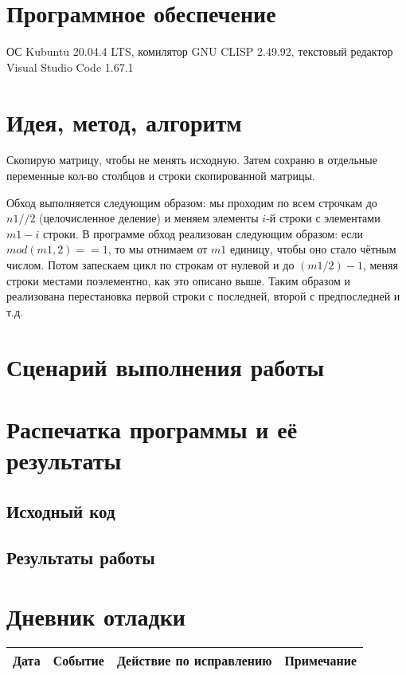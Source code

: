 \documentclass[12pt]{article}
\begin{document}
\section{Программное обеспечение}
ОС Kubuntu 20.04.4 LTS, комилятор GNU CLISP 2.49.92, текстовый редактор Visual Studio Code 1.67.1

\pagebreak
\section{Идея, метод, алгоритм}
Скопирую матрицу, чтобы не менять исходную. Затем сохраню в отдельные переменные кол-во столбцов и строки скопированной матрицы.

Обход выполняется следующим образом: мы проходим по всем строчкам до $n1 // 2$ (целочисленное деление) и меняем элементы $i$-й строки с элементами
$m1 - i$ строки. В программе обход реализован следующим образом: если $mod(m1, 2) == 1$, то мы отнимаем от $m1$ единицу, чтобы оно стало чётным числом.
Потом запескаем цикл по строкам от нулевой и до $(m1 / 2) - 1$, меняя строки местами поэлементно, как это описано выше. Таким образом и реализована 
перестановка первой строки с последней, второй с предпоследней и т.д.

\section{Сценарий выполнения работы}

\section{Распечатка программы и её результаты}

\subsection{Исходный код}


\pagebreak
\subsection{Результаты работы}


\pagebreak
\section{Дневник отладки}
\begin{tabular}{|p{50pt}|p{140pt}|p{140pt}|p{80pt}|}
\hline
Дата & Событие & Действие по исправлению & Примечание \\
\hline
\end{tabular}
\end{document}
